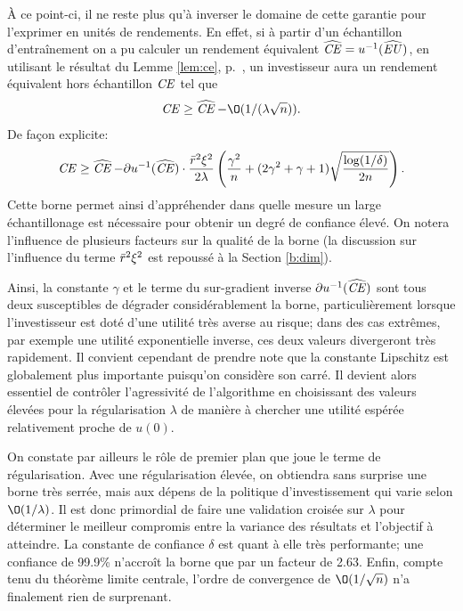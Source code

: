 À ce point-ci, il ne reste plus qu'à inverser le domaine de cette garantie pour l'exprimer
en unités de rendements. En effet, si à partir d'un échantillon d'entraînement on a pu
calculer un rendement équivalent $\operatorname{\widehat{\operatorname{\mbox{\textit{CE}}}}} = u^{-1}(\operatorname{\widehat{\operatorname{\mbox{\textit{EU}}}}})$, en utilisant le résultat du
Lemme \ref{lem:ce}, p.~\pageref{lem:ce}, un investisseur aura un rendement équivalent hors
échantillon $\operatorname{\mbox{\textit{CE}}}$ tel que
\begin{equation}
  \nCE \geq \nhCE - \O(1/(\lambda\sqrt{n})).
\end{equation}
De façon explicite:
\begin{equation}
  \operatorname{\mbox{\textit{CE}}} \geq \operatorname{\widehat{\operatorname{\mbox{\textit{CE}}}}} - \partial u^{-1}(\operatorname{\widehat{\operatorname{\mbox{\textit{CE}}}}})\cdot \frac{\bar r^2\xi^2}{2\lambda}\left(\frac{\gamma^2}{n} + (2\gamma^2+\gamma+1)\sqrt{\frac{\log(1/\delta)}{2n}}\right).
\end{equation}
Cette borne permet ainsi d'appréhender dans quelle mesure un large échantillonage est
nécessaire pour obtenir un degré de confiance élevé. On notera l'influence de plusieurs
facteurs sur la qualité de la borne (la discussion sur l'influence du terme $\bar r^2\xi^2$
est repoussé à la Section \ref{b:dim}).

Ainsi, la constante $\gamma$ et le terme du sur-gradient inverse $\partial u^{-1}(\operatorname{\widehat{\operatorname{\mbox{\textit{CE}}}}})$ sont tous
deux susceptibles de dégrader considérablement la borne, particulièrement lorsque
l'investisseur est doté d'une utilité très averse au risque; dans des cas extrêmes, par
exemple une utilité exponentielle inverse, ces deux valeurs divergeront très
rapidement. Il convient cependant de prendre note que la constante Lipschitz est
globalement plus importante puisqu'on considère son carré. Il devient alors essentiel de
contrôler l'agressivité de l'algorithme en choisissant des valeurs élevées pour la
régularisation $\lambda$ de manière à chercher une utilité espérée relativement proche de
$u(0)$.

On constate par ailleurs le rôle de premier plan que joue le terme de régularisation. Avec
une régularisation élevée, on obtiendra sans surprise une borne très serrée, mais aux
dépens de la politique d'investissement qui varie selon $\O(1/\lambda)$. Il est donc primordial
de faire une validation croisée sur $\lambda$ pour déterminer le meilleur compromis entre la
variance des résultats et l'objectif à atteindre. La constante de confiance $\delta$ est quant
à elle très performante; une confiance de \num{99.9}\% n'accroît la borne que par un
facteur de \num{2.63}. Enfin, compte tenu du théorème limite centrale, l'ordre de
convergence de $\O(1/\sqrt{n})$ n'a finalement rien de surprenant.





